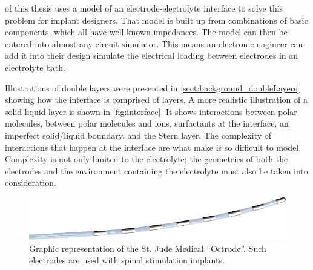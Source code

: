    of this thesis uses a model of an electrode-electrolyte interface to solve this problem for implant designers.
  That model is built up from combinations of basic components, which all have well known impedances.
  The model can then be entered into almost any circuit simulator.
  This means an electronic engineer can add it into their design simulate the electrical loading between electrodes in an electrolyte bath.

  Illustrations of double layers were presented in \cref{sect:background_doubleLayers} showing how the interface is comprised of layers.
  A more realistic illustration of a solid-liquid layer is shown in \cref{fig:interface}.
  It shows interactions between polar molecules, between polar molecules and ions, surfactants at the interface, an imperfect solid/liquid boundary, and the Stern layer.
  The complexity of interactions that happen at the interface are what make is so difficult to model.
  Complexity is not only limited to the electrolyte; the geometries of both the electrodes and the environment containing the electrolyte must also be taken into consideration.

  \begin{figure}
    \begin{center}
      \includegraphics{content/introduction/graphics/StJudeOctrode}
    \end{center}
    \caption{Graphic representation of the St. Jude Medical ``Octrode''. Such electrodes are used with spinal stimulation implants.}
    \label{fig:octrode}
  \end{figure}


